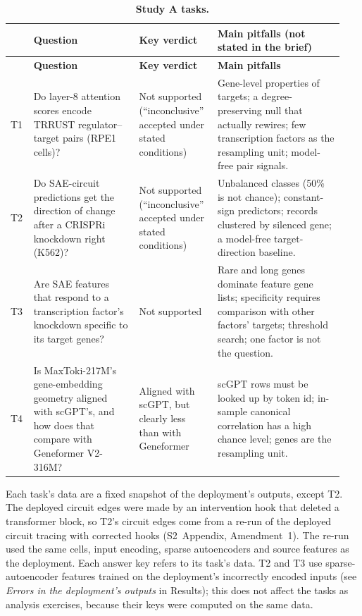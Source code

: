 {\footnotesize
\setlength{\tabcolsep}{4pt}
\renewcommand{\arraystretch}{1.15}
\begin{longtable}{@{}p{0.06\linewidth}p{0.30\linewidth}p{0.22\linewidth}p{0.36\linewidth}@{}}
\caption{\textbf{Study A tasks.}}
\label{tab:tasks}\\
\toprule
& \textbf{Question} & \textbf{Key verdict} & \textbf{Main pitfalls (not stated in the brief)} \\
\midrule
\endfirsthead
\toprule
& \textbf{Question} & \textbf{Key verdict} & \textbf{Main pitfalls} \\
\midrule
\endhead
\bottomrule
\endlastfoot
T1 & Do layer-8 attention scores encode TRRUST regulator--target pairs
(RPE1 cells)? & Not supported (``inconclusive'' accepted under stated
conditions) & Gene-level properties of targets; a degree-preserving null
that actually rewires; few transcription factors as the resampling unit;
model-free pair signals. \\
T2 & Do SAE-circuit predictions get the direction of change after a
CRISPRi knockdown right (K562)? & Not supported (``inconclusive''
accepted under stated conditions) & Unbalanced classes (50\% is not
chance); constant-sign predictors; records clustered by silenced gene; a
model-free target-direction baseline. \\
T3 & Are SAE features that respond to a transcription factor's knockdown
specific to its target genes? & Not supported & Rare and long genes
dominate feature gene lists; specificity requires comparison with other
factors' targets; threshold search; one factor is not the question. \\
T4 & Is MaxToki-217M's gene-embedding geometry aligned with scGPT's, and
how does that compare with Geneformer V2-316M? & Aligned with scGPT, but
clearly less than with Geneformer & scGPT rows must be looked up by
token id; in-sample canonical correlation has a high chance level; genes
are the resampling unit. \\
\end{longtable}
\begin{flushleft}
Each task's data are a fixed snapshot of
the deployment's outputs, except T2. The deployed circuit edges were made
by an intervention hook that deleted a transformer block, so T2's circuit edges come from a re-run
of the deployed circuit tracing with corrected hooks (S2~Appendix,
Amendment~1). The re-run used the same cells, input encoding, sparse
autoencoders and source features as the deployment. Each answer key
refers to its task's data. T2 and T3 use sparse-autoencoder features trained on the deployment's incorrectly
encoded inputs (see \emph{Errors in the deployment's outputs} in
Results); this does not affect the tasks as analysis exercises, because
their keys were computed on the same data.
\end{flushleft}
}
